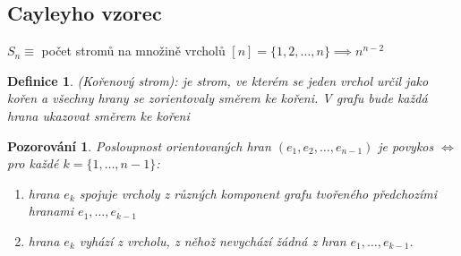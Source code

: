 \documentclass[10pt,a4paper]{article}
\newtheorem{definice}{Definice}
\newtheorem{pozorovani}{Pozorování}
\begin{document}
\newpage

\subsection{Cayleyho vzorec}
$S_n \equiv $ počet stromů na množině vrcholů $[n]=\{1, 2, \dots, n\} \implies n^{n-2}$

\begin{definice}(Kořenový strom): \normalfont 
    je strom, ve kterém se jeden vrchol určil jako kořen a všechny hrany se zorientovaly směrem ke kořeni.
    \textit{V grafu bude každá hrana ukazovat směrem ke kořeni}
\end{definice}


\begin{pozorovani}Posloupnost orientovaných hran $(e_1, e_2, \dots, e_{n-1})$ je povykos $\iff$ pro každé $k = \{1, \dots, n-1\}$:
    \begin{enumerate}[label=(\arabic*)]
        \item hrana $e_k$ spojuje vrcholy z různých komponent grafu tvořeného předchozími hranami $e_1, \dots, e_{k-1}$
        \item hrana $e_k$ vyhází z vrcholu, z něhož nevychází žádná z hran $e_1, \dots, e_{k-1}$.
    \end{enumerate}
\end{pozorovani}
\end{document}
